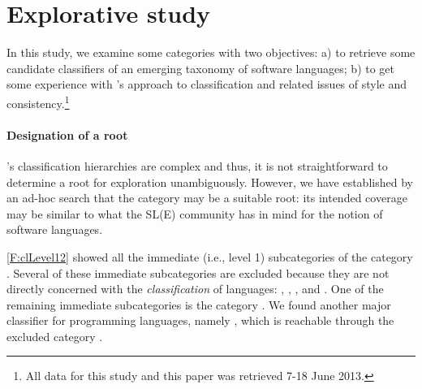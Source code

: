 
\section{Explorative study}
\label{S:study}

\vspace{-27\in}

In this study, we examine some \Wikipedia{} categories with two objectives: a) to retrieve some candidate classifiers of an emerging taxonomy of software languages; b) to get some experience with \Wikipedia's approach to classification and related issues of style and consistency.\footnote{All \Wikipedia{} data for this study and this paper was retrieved 7-18 June 2013.}


\vspace{-27\in}

\paragraph*{\textbf{Designation of a root}}

\Wikipedia's classification hierarchies are complex and thus, it is not straightforward to determine a root for exploration unambiguously. However, we have established by an ad-hoc search that the category  may be a suitable root: its intended coverage may be similar to what the SL(E) community has in mind for the notion of software languages.

\autoref{F:clLevel12} showed all the immediate (i.e., level 1) subcategories of the category . Several of these immediate subcategories are excluded because they are not directly concerned with the \emph{classification} of languages: , , , and . One of the remaining immediate subcategories is the category . We found another major classifier for programming languages, namely , which is reachable through the excluded category .


